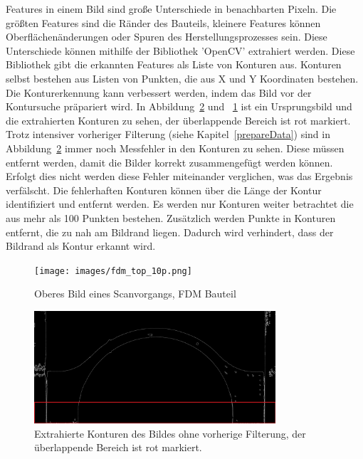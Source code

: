 Features in einem Bild sind große Unterschiede in benachbarten Pixeln. Die größten
Features sind die Ränder des Bauteils, kleinere Features können Oberflächenänderungen 
oder Spuren des Herstellungsprozesses sein. Diese Unterschiede können mithilfe 
der Bibliothek 'OpenCV' extrahiert werden. Diese Bibliothek gibt die erkannten 
Features als Liste von Konturen aus. Konturen selbst bestehen aus Listen von 
Punkten, die aus X und Y Koordinaten bestehen. Die Konturerkennung kann verbessert 
werden, indem das Bild vor der Kontursuche präpariert wird. In Abbildung~\ref{fig:cons} und
~\ref{fig:image_top} ist ein Ursprungsbild und die extrahierten Konturen zu sehen, 
der überlappende Bereich ist rot markiert.
Trotz intensiver vorheriger Filterung (siehe Kapitel~\ref{prepareData}) sind in 
Abbildung~\ref{fig:cons} immer noch Messfehler in den Konturen zu sehen. 
Diese müssen entfernt werden, damit die Bilder 
korrekt zusammengefügt werden können. Erfolgt dies nicht werden diese Fehler miteinander
verglichen, was das Ergebnis verfälscht.
Die fehlerhaften Konturen können über die Länge der Kontur identifiziert und entfernt werden. 
Es werden nur Konturen weiter betrachtet die aus mehr als 100 Punkten bestehen. 
Zusätzlich werden Punkte in Konturen entfernt, die zu nah am Bildrand liegen. 
Dadurch wird verhindert, dass der Bildrand als Kontur erkannt wird.

\begin{figure}[h]
    \centering
    \texttt{[image: images/fdm\_top\_10p.png]} %
    \caption{Oberes Bild eines Scanvorgangs, FDM Bauteil}
    \label{fig:image_top}
\end{figure}

\begin{figure}[h]
    \centering
    \includegraphics[width=0.8\textwidth]{images/contours_of_image.png} %
    \caption{Extrahierte Konturen des Bildes ohne vorherige Filterung, 
    der überlappende Bereich ist rot markiert.}
    \label{fig:cons}
\end{figure}

